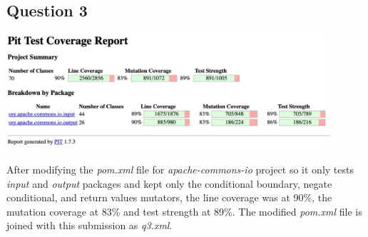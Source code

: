 \subsection*{Question 3}

\begin{center}
        \includegraphics[width=0.9\textwidth]{img/partD-coverage.jpg}
\end{center}

\noindent After modifying the \textit{pom.xml} file for \textit{apache-commons-io} project so it only tests \textit{input} and \textit{output} packages and kept only the conditional boundary, negate conditional, and return values mutators, the line coverage was at 90\%, the mutation coverage at 83\% and test strength at 89\%. The modified \textit{pom.xml} file is joined with this submission as \textit{q3.xml}.
